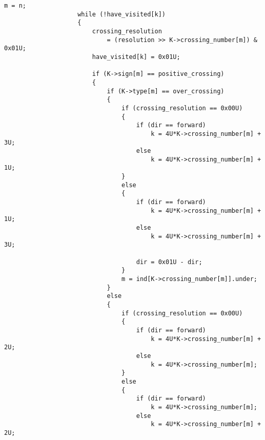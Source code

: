 \documentclass{article}
\theoremstyle{plain}
\begin{document}
        \begin{lstlisting}[style=CStyle, gobble=12]
                    m = n;
                    while (!have_visited[k])
                    {
                        crossing_resolution
                            = (resolution >> K->crossing_number[m]) & 0x01U;
                        have_visited[k] = 0x01U;

                        if (K->sign[m] == positive_crossing)
                        {
                            if (K->type[m] == over_crossing)
                            {
                                if (crossing_resolution == 0x00U)
                                {
                                    if (dir == forward)
                                        k = 4U*K->crossing_number[m] + 3U;
                                    else
                                        k = 4U*K->crossing_number[m] + 1U;
                                }
                                else
                                {
                                    if (dir == forward)
                                        k = 4U*K->crossing_number[m] + 1U;
                                    else
                                        k = 4U*K->crossing_number[m] + 3U;

                                    dir = 0x01U - dir;
                                }
                                m = ind[K->crossing_number[m]].under;
                            }
                            else
                            {
                                if (crossing_resolution == 0x00U)
                                {
                                    if (dir == forward)
                                        k = 4U*K->crossing_number[m] + 2U;
                                    else
                                        k = 4U*K->crossing_number[m];
                                }
                                else
                                {
                                    if (dir == forward)
                                        k = 4U*K->crossing_number[m];
                                    else
                                        k = 4U*K->crossing_number[m] + 2U;


\end{lstlisting}
\end{document}
